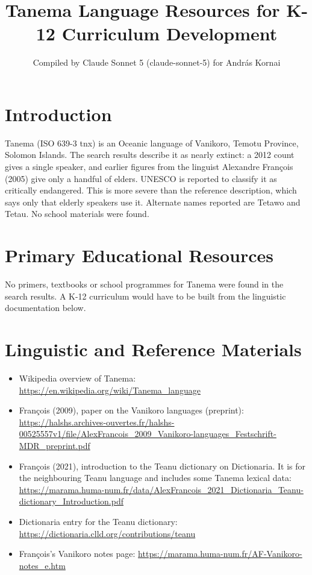 \documentclass[12pt]{article}
\title{Tanema Language Resources for K-12 Curriculum Development}
\author{Compiled by Claude Sonnet 5 (claude-sonnet-5) for Andr\'as Kornai}
\date{}
\begin{document}
\maketitle

\section{Introduction}
Tanema (ISO 639-3 tnx) is an Oceanic language of Vanikoro, Temotu Province, Solomon Islands. The search results describe it as nearly extinct: a 2012 count gives a single speaker, and earlier figures from the linguist Alexandre Fran\c{c}ois (2005) give only a handful of elders. UNESCO is reported to classify it as critically endangered. This is more severe than the reference description, which says only that elderly speakers use it. Alternate names reported are Tetawo and Tetau. No school materials were found.

\section{Primary Educational Resources}
No primers, textbooks or school programmes for Tanema were found in the search results. A K-12 curriculum would have to be built from the linguistic documentation below.

\section{Linguistic and Reference Materials}
\begin{itemize}
\item Wikipedia overview of Tanema: \url{https://en.wikipedia.org/wiki/Tanema_language}
\item Fran\c{c}ois (2009), paper on the Vanikoro languages (preprint): \url{https://halshs.archives-ouvertes.fr/halshs-00525557v1/file/AlexFrancois_2009_Vanikoro-languages_Festschrift-MDR_preprint.pdf}
\item Fran\c{c}ois (2021), introduction to the Teanu dictionary on Dictionaria. It is for the neighbouring Teanu language and includes some Tanema lexical data: \url{https://marama.huma-num.fr/data/AlexFrancois_2021_Dictionaria_Teanu-dictionary_Introduction.pdf}
\item Dictionaria entry for the Teanu dictionary: \url{https://dictionaria.clld.org/contributions/teanu}
\item Fran\c{c}ois's Vanikoro notes page: \url{https://marama.huma-num.fr/AF-Vanikoro-notes_e.htm}
\end{itemize}
\end{document}
